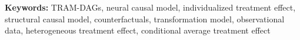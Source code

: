 \documentclass[11pt,a4paper,twoside]{book}
\begin{document}
% 
% 
% 

\bigskip

\noindent\textbf{Keywords:} TRAM-DAGs, neural causal model, individualized treatment effect, structural causal model, counterfactuals, transformation model, observational data, heterogeneous treatment effect, conditional average treatment effect





\cleardoublepage




\end{document}
